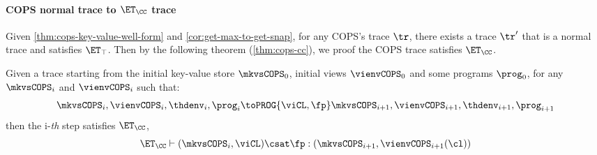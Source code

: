 \paragraph{\bf COPS normal trace to \( \ET_\CC \) trace}
Given \cref{thm:cops-key-value-well-form} and \cref{cor:get-max-to-get-snap}, for any COPS's trace \( \tr \), 
there exists a trace \( \tr' \) that is a normal trace and satisfies \( \ET_\top \).
Then by the following theorem (\cref{thm:cops-cc}), we proof the COPS trace satisfies \( \ET_\CC \).

\begin{theorem}
    \label{thm:cops-cc}
    Given a trace starting from the initial key-value store \( \mkvsCOPS_0 \), initial views \( \vienvCOPS_0 \) and some programs \( \prog_0 \), for any \( \mkvsCOPS_i \) and \( \vienvCOPS_i \)  such that: 
    \[
        \mkvsCOPS_i, \vienvCOPS_i, \thdenv_i, \prog_i \toPROG{\viCL,\fp} \mkvsCOPS_{i+1}, \vienvCOPS_{i+1}, \thdenv_{i+1}, \prog_{i+1} 
    \]
    then the i-\emph{th} step satisfies \( \ET_\CC \), \ie
    \[
        \ET_\CC \vdash ( \mkvsCOPS_i, \viCL ) \csat \fp : (\mkvsCOPS_{i+1},\vienvCOPS_{i+1}(\cl) )
    \]
\end{theorem}
